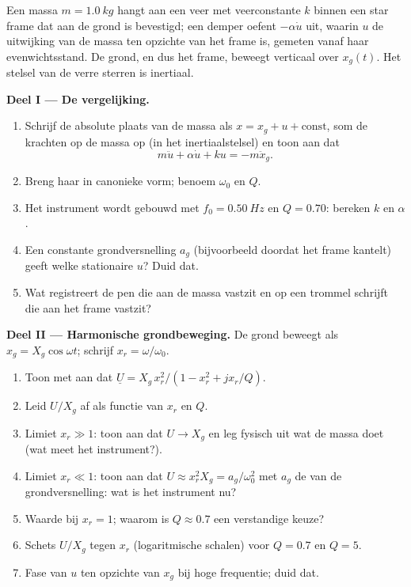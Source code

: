 \begin{problem}
\label{pb:b1:oscillators-resonance:1}
Een massa $m = \qty{1.0}{kg}$ hangt aan een veer met veerconstante $k$ binnen
een star frame dat aan de grond is bevestigd; een demper oefent $-\alpha\dot u$ uit, waarin
$u$ de uitwijking van de massa ten opzichte van het frame is, gemeten
vanaf haar evenwichtsstand. De grond, en dus het frame, beweegt
verticaal over $x_g(t)$. Het stelsel van de verre sterren is inertiaal.

\medskip
\noindent\textbf{Deel I --- De vergelijking.}
\begin{enumerate}
  \item Schrijf de absolute plaats van de massa als $x = x_g + u +
        \text{const}$, som de krachten op de massa op (in het inertiaalstelsel)
        en toon aan dat
        \[
        m\ddot u + \alpha\dot u + ku = -m\ddot x_g .
        \]
  \item Breng haar in canonieke vorm; benoem $\omega_0$ en $Q$.
  \item Het instrument wordt gebouwd met $f_0 = \qty{0.50}{Hz}$ en $Q = 0.70$:
        bereken $k$ en $\alpha$.
  \item Een constante grondversnelling $a_g$ (bijvoorbeeld doordat het frame
        kantelt) geeft welke stationaire $u$? Duid dat.
  \item Wat registreert de pen die aan de massa vastzit en op een trommel
        schrijft die aan het frame vastzit?
\end{enumerate}

\medskip
\noindent\textbf{Deel II --- Harmonische grondbeweging.}
De grond beweegt als $x_g = X_g\cos\omega t$; schrijf $x_r = \omega/\omega_0$.
\begin{enumerate}[resume]
  \item Toon met  aan dat $\underline U = X_g\,x_r^2/
        (1 - x_r^2 + jx_r/Q)$.
  \item Leid $U/X_g$ af als functie van $x_r$ en $Q$.
  \item Limiet $x_r \gg 1$: toon aan dat $U \to X_g$ en leg fysisch uit wat
        de massa doet (wat meet het instrument?).
  \item Limiet $x_r \ll 1$: toon aan dat $U \approx x_r^2X_g = a_g/\omega_0^2$ met
        $a_g$ de  van de grondversnelling: wat is het instrument
        nu?
  \item Waarde bij $x_r = 1$; waarom is $Q \approx 0.7$ een verstandige keuze?
  \item Schets $U/X_g$ tegen $x_r$ (logaritmische schalen) voor $Q = 0.7$ en
        $Q = 5$.
  \item Fase van $u$ ten opzichte van $x_g$ bij hoge frequentie; duid dat.
\end{enumerate}


\end{problem}
